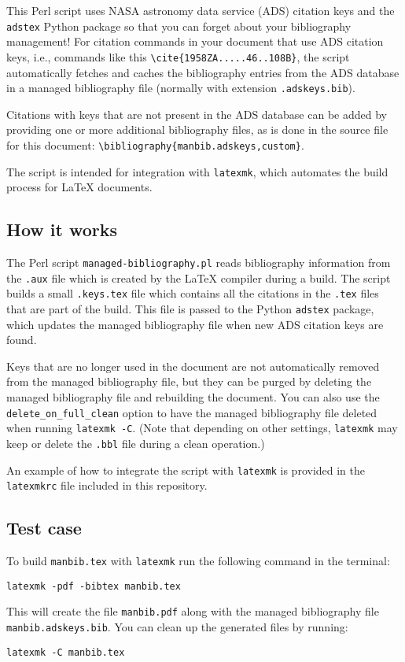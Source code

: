 This Perl script uses NASA astronomy data service (ADS) citation keys
and the \texttt{adstex} Python package so that you can forget about your
bibliography management! For citation commands in your document that use
ADS citation keys, i.e., commands like this
\texttt{\textbackslash{}cite\{1958ZA.....46..108B\}}, the script
automatically fetches and caches the bibliography entries from the ADS
database in a managed bibliography file (normally with extension
\texttt{.adskeys.bib}).

Citations with keys that are not present in the ADS database can be
added by providing one or more additional bibliography files, as is done
in the source file for this document:
\texttt{\textbackslash{}bibliography\{manbib.adskeys,custom\}}.

The script is intended for integration with \texttt{latexmk}, which
automates the build process for LaTeX documents.

\subsection{How it works}\label{how-it-works}

The Perl script \texttt{managed-bibliography.pl} reads bibliography
information from the \texttt{.aux} file which is created by the LaTeX
compiler during a build. The script builds a small \texttt{.keys.tex}
file which contains all the citations in the \texttt{.tex} files that
are part of the build. This file is passed to the Python \texttt{adstex}
package, which updates the managed bibliography file when new ADS
citation keys are found.

Keys that are no longer used in the document are not automatically
removed from the managed bibliography file, but they can be purged by
deleting the managed bibliography file and rebuilding the document. You
can also use the \texttt{delete\_on\_full\_clean} option to have the
managed bibliography file deleted when running \texttt{latexmk\ -C}.
(Note that depending on other settings, \texttt{latexmk} may keep or
delete the \texttt{.bbl} file during a clean operation.)

An example of how to integrate the script with \texttt{latexmk} is
provided in the \texttt{latexmkrc} file included in this repository.

\subsection{Test case}\label{test-case}

To build \texttt{manbib.tex} with \texttt{latexmk} run the following
command in the terminal:

\begin{verbatim}
latexmk -pdf -bibtex manbib.tex
\end{verbatim}

This will create the file \texttt{manbib.pdf} along with the managed
bibliography file \texttt{manbib.adskeys.bib}. You can clean up the
generated files by running:

\begin{verbatim}
latexmk -C manbib.tex
\end{verbatim}
